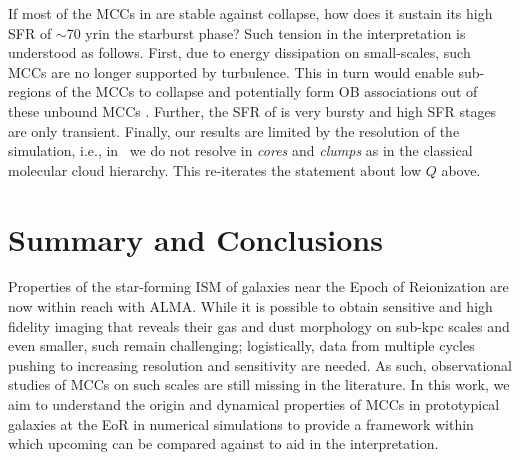 \IfFileExists{emulateapjlegacy.cls}{\documentclass[iop]{emulateapjlegacy}}{\documentclass[iop]{emulateapj}}
\newcommand{\AP}[1]{({\bf \color{apcolor} AP: #1})}
\newcommand{\MM}[1]{({\bf \color{mmcolor} MM: #1})}
\begin{document}
If most of the MCCs in \flower are stable against collapse, how does it sustain its high SFR of $\sim$70\,\Msun\,yr\pmOne in the starburst phase? Such tension in the interpretation is understood as follows.
%
First, due to energy dissipation on small-scales, such MCCs are no longer supported by turbulence. This in turn would enable
sub-regions of the MCCs to collapse and potentially form OB associations out of these unbound MCCs \citep{Clark04a, Clark05a}.
Further, the SFR of \flower is very bursty and high SFR stages are only transient.
%
Finally, our results are limited by the resolution of the simulation, i.e., in \flower~we do not resolve \SF in {\it cores} and {\it clumps} as in the classical molecular cloud hierarchy. This re-iterates the statement about low $Q$ above.


\section{Summary and Conclusions}      \label{sec:conclusion}

Properties of the star-forming ISM of galaxies near the Epoch of Reionization are now within reach with ALMA. While it is possible to obtain sensitive and high fidelity imaging that reveals their gas and dust morphology on sub-kpc scales and even smaller, such \obs remain challenging; logistically, data from multiple cycles pushing to increasing resolution and sensitivity are needed. As such, observational studies of MCCs on such scales are still missing in the literature.
%
In this work, we aim to understand the origin and dynamical properties of MCCs in prototypical galaxies at the EoR in numerical simulations to provide a framework within which upcoming \obs can be compared against to aid in the interpretation.
\end{document}
